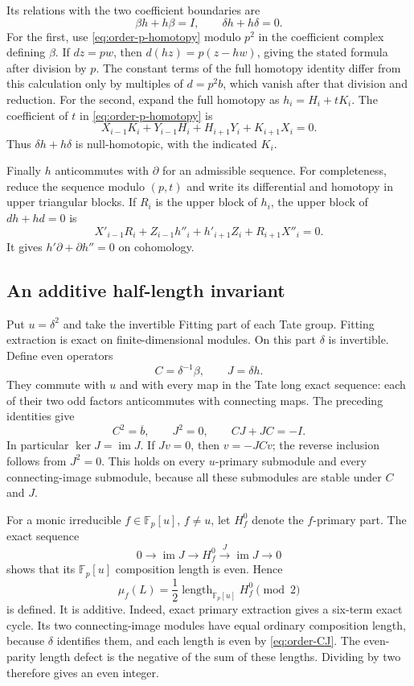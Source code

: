 Its relations with the two coefficient boundaries are
\begin{equation}\label{eq:order-h-boundaries}
 \beta h+h\beta=I,\qquad \delta h+h\delta=0.
\end{equation}
For the first, use \eqref{eq:order-p-homotopy} modulo $p^2$ in the
coefficient complex defining $\beta$.  If $dz=pw$, then
$d(hz)=p(z-hw)$, giving the stated formula after division by $p$.
The constant terms of the full homotopy identity differ from this
calculation only by multiples of $d=p^2b$, which vanish after that
division and reduction.
For the second, expand the full homotopy as $h_i=H_i+tK_i$.
The coefficient of $t$ in \eqref{eq:order-p-homotopy} is
\[
 X_{i-1}K_i+Y_{i-1}H_i+H_{i+1}Y_i+K_{i+1}X_i=0.
\]
Thus $\delta h+h\delta$ is null-homotopic, with the indicated $K_i$.

Finally $h$ anticommutes with $\partial$ for an admissible sequence.
For completeness, reduce the sequence modulo $(p,t)$ and write
its differential and homotopy in upper triangular blocks.  If $R_i$
is the upper block of $h_i$, the upper block of $dh+hd=0$ is
\[
 X'_{i-1}R_i+Z_{i-1}h''_i+h'_{i+1}Z_i+R_{i+1}X''_i=0.
\]
It gives $h'\partial+\partial h''=0$ on cohomology.

\subsection{An additive half-length invariant}

Put $u=\delta^2$ and take the invertible Fitting part of each Tate
group.  Fitting extraction is exact on finite-dimensional modules.
On this part $\delta$ is invertible.  Define even operators
\[
 C=\delta^{-1}\beta,\qquad J=\delta h.
\]
They commute with $u$ and with every map in the Tate long exact
sequence: each of their two odd factors anticommutes with connecting
maps.  The preceding identities give
\begin{equation}\label{eq:order-CJ}
 C^2=\overline b,\qquad J^2=0,\qquad CJ+JC=-I.
\end{equation}
In particular $\ker J=\operatorname{im}J$.  If $Jv=0$, then
$v=-JCv$; the reverse inclusion follows from $J^2=0$.
This holds on every $u$-primary submodule and every connecting-image
submodule, because all these submodules are stable under $C$ and $J$.

For a monic irreducible $f\in\mathbb F_p[u]$, $f\ne u$, let
$H^0_f$ denote the $f$-primary part.  The exact sequence
\[
 0\longrightarrow\operatorname{im}J\longrightarrow H^0_f
   \xrightarrow{J}\operatorname{im}J\longrightarrow0
\]
shows that its $\mathbb F_p[u]$ composition length is even.  Hence
\begin{equation}\label{eq:order-half-length}
 \mu_f(L)=\frac12\operatorname{length}_{\mathbb F_p[u]}H^0_f
                    \pmod2
\end{equation}
is defined.  It is additive.  Indeed, exact primary extraction gives a
six-term exact cycle.  Its two connecting-image modules have equal
ordinary composition length, because $\delta$ identifies them, and
each length is even by \eqref{eq:order-CJ}.  The even-parity length
defect is the negative of the sum of these lengths.  Dividing by two
therefore gives an even integer.

